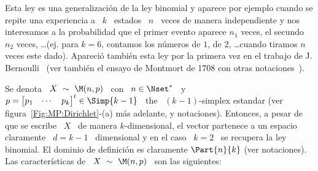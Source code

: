 \label{Sssec:MP:Multinomial}

Esta ley es una generalizaci\'on de la ley binomial y aparece por ejemplo cuando
se  repite  una  experiencia  a  \  $k$  \ estados  \  $n$  \  veces  de  manera
independiente y nos  interesamos a la probabilidad que  el primer evento aparece
$n_1$ veces,  el secundo  $n_2$ veces, \ldots  (ej. para  $k = 6$,  contamos los
n\'umeros de $1$, de $2$, \ldots cuando tiramos $n$ veces este dado). Apareci\'o
tambi\'en   esta   ley   por   la    primera   vez   en   el   trabajo   de   J.
Bernoulli~\cite{Ber1713, Hal90,  DavEdw01} (ver tambi\'en el  ensayo de Montmort
de 1708 con otras notaciones~\cite{Mon13}).

Se  denota  \  $X  \ \sim  \  \M(n,p)$  \  con  \  $n  \in  \Nset^*$ \  y  \  $p
= \begin{bmatrix}  p_1 & \cdots  & p_k \end{bmatrix}^t  \in \Simp{k-1}$ \  the \
$(k-1)$-simplex estandar  (ver figura~\ref{Fig:MP:Dirichlet}-(a) m\'as adelante,
y  notaciones).   Entonces,  a pesar  de  que  se  escribe  \  $X$ \  de  manera
$k$-dimensional,  el vector  partenece a  un espacio  claramente \  $d =  k-1$ \
dimensional y en el caso \ $k = 2$ \ se recupera la ley binomial.  El dominio de
definici\'on es claramente $\Part{n}{k}$ (ver notaciones). Las caracter\'isticas
de \ $X \ \sim \ \M(n,p)$ \ son las siguientes:


